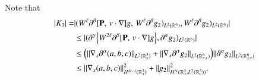 \documentclass{amsart}[12pt, article]
\begin{document}
Note that
\begin{align*}
|K_3|=&|(W^\ell {{\partial}}^\beta [{{\bf P}},\, v\cdot \nabla]g,\,
W^\ell{{\partial}}^\beta g_2)_{L^2({{{\mathbb R}}}^6)},W^\ell{{\partial}}^\beta g_2)_{L^2({{{\mathbb R}}}^6)}|
\\&
\le |({{\partial}}^\gamma \Big\{W^{2\ell} {{\partial}}^\beta [{{\bf P}},\, v\cdot \nabla]g\Big\},
{{\partial}}^\alpha g_2)_{L^2({{{\mathbb R}}}^6)}|
\\&
\le\Big(
\|\nabla_x{{\partial}}^\alpha (a,b,c)\|_{L^2({{{\mathbb R}}}^3_x)}+\|\nabla_x{{\partial}}^\alpha g_2\|_{L^2({{{\mathbb R}}}^6_{x, v})}\Big)
\|{{\partial}}^\alpha  g_2\|_{L^2({{{\mathbb R}}}^6_{x, v})}
\\&\le
\|\nabla_x (a,b,c)\|_{H^{N-1}({{{\mathbb R}}}^3_x)}^2
+\|g_2\|_{H^N({{{\mathbb R}}}^3_x, L^2({{{\mathbb R}}}^3_v))}^2.
\end{align*}
\end{document}
